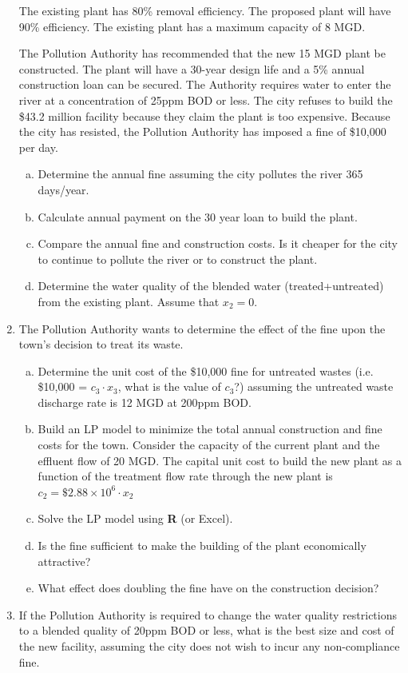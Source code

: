 \documentclass[12pt]{article}
\begin{document}
\begin{enumerate}
The existing plant has 80\% removal efficiency.  
The proposed plant will have 90\% efficiency.  
The existing plant has a maximum capacity of 8 MGD.

The Pollution Authority has recommended that the new 15 MGD plant be constructed. 
The plant will have a 30-year design life and a 5\% annual construction loan can be secured.
The Authority requires water to enter the river at a concentration of 25ppm BOD or less.
The city refuses to build the \$43.2 million facility because they claim the plant is too expensive.
Because the city has resisted, the Pollution Authority has imposed a fine of \$10,000 per day.
\begin{enumerate}[a)]
\item Determine the annual fine assuming the city pollutes the river 365 days/year.
\item Calculate annual payment on the 30 year loan to build the plant.
\item Compare the annual fine and construction costs.  Is it cheaper for the city to continue to pollute the river or to construct the plant.
\item Determine the water quality of the blended water (treated+untreated) from the existing plant.  Assume that $x_2=0$.
\end{enumerate}

\item The Pollution Authority wants to determine the effect of the fine upon the town's decision to treat its waste.
\begin{enumerate}[a)]
\item Determine the unit cost of the \$10,000 fine for untreated wastes (i.e.  \$10,000 = $c_3 \cdot x_3$, what is the value of $c_3$?) assuming the untreated waste discharge rate is 12 MGD at 200ppm BOD.
\item Build an LP model to minimize the total annual construction and fine costs for the town.  Consider the capacity of the current plant and the effluent flow of 20 MGD.  The capital unit cost to build the new plant as a function of the treatment flow rate through the new plant is 
$c_2= \$2.88 \times10^{6} \cdot x_2 $
\item Solve the LP model using \textbf{R} (or Excel).
\item Is the fine sufficient to make the building of the plant economically attractive?
\item What effect does doubling the fine have on the construction decision?
\end{enumerate}
\item If the Pollution Authority is required to change the water quality restrictions to a blended quality of 20ppm BOD or less, what is the best size and cost of the new facility, assuming the city does not wish to incur any non-compliance fine. 
\end{enumerate}
\end{document}
